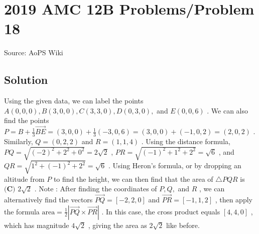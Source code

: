 \documentclass[12pt]{article}
\begin{document}
\section*{{2019 AMC 12B Problems/Problem 18}}
Source: AoPS Wiki

\subsection*{Solution}
Using the given data, we can label the points $A(0, 0, 0), B(3, 0, 0), C(3, 3, 0), D(0, 3, 0),$ and $E(0, 0, 6)$ . We can also find the points $P = B + \frac{1}{3} \overrightarrow{BE} = (3,0,0) + \frac{1}{3}(-3, 0, 6) = (3,0,0) + (-1,0,2) = (2, 0, 2)$ . Similarly, $Q = (0, 2, 2)$ and $R = (1, 1, 4)$ . Using the distance formula, $PQ = \sqrt{\left(-2\right)^2 + 2^2 + 0^2} = 2\sqrt{2}$ , $PR = \sqrt{\left(-1\right)^2 + 1^2 + 2^2} = \sqrt{6}$ , and $QR = \sqrt{1^2 + \left(-1\right)^2 + 2^2} = \sqrt{6}$ . Using Heron's formula, or by dropping an altitude from $P$ to find the height, we can then find that the area of $\triangle{PQR}$ is $\boxed{\textbf{(C) }2\sqrt{2}}$ . Note : After finding the coordinates of $P,Q,$ and $R$ , we can alternatively find the vectors $\overrightarrow{PQ}=[-2,2,0]$ and $\overrightarrow{PR}=[-1,1,2]$ , then apply the formula $\text{area} = \frac{1}{2}\left|\overrightarrow{PQ} \times \overrightarrow{PR}\right|$ . In this case, the cross product equals $[4,4,0]$ , which has magnitude $4\sqrt{2}$ , giving the area as $2\sqrt{2}$ like before.
\end{document}

